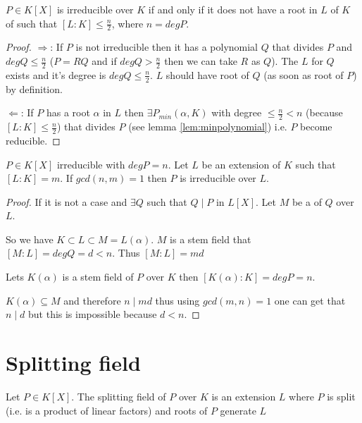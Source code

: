 \begin{corollary}
  $P \in K\left[X\right]$ is irreducible over $K$ if and only if it
  does not have a root in  $L$ of $K$ of such that
  $\left[L:K\right] \le \frac{n}{2}$, where $n = deg P$.
  \label{cor:lec2_1}
  \begin{proof}
    $\Rightarrow$: If $P$ is not irreducible then it has a polynomial $Q$ that
    divides $P$ and $deg Q \le \frac{n}{2}$ ($P = RQ$ and if
    $deg Q > \frac{n}{2}$ then we can take $R$ as $Q$). The
     $L$ for $Q$ exists and it's degree is $deg Q
    \le \frac{n}{2}$. $L$ should have root of $Q$ (as soon as root of
    $P$) by definition.

    $\Leftarrow$: If $P$ has a root $\alpha$ in $L$ then $\exists
    P_{min}\left(\alpha, K\right)$ with degree
    $\le \frac{n}{2} < n$ (because $\left[L:K\right] \le \frac{n}{2}$)
    that divides $P$ (see lemma \ref{lem:minpolynomial}) i.e. $P$
    become reducible. 
  \end{proof}
\end{corollary}

\begin{corollary}
  $P \in K\left[X\right]$ irreducible with $deg P = n$. Let $L$ be an
  extension of $K$ such that $\left[L:K\right] = m$.
  If $gcd\left(n,m\right) = 1$ then $P$ is irreducible over $L$.
  \label{cor:lec2_2}
  \begin{proof}
    If it is not a case and $\exists Q$ such that $Q \mid P$ in
    $L\left[X\right]$. Let $M$ be a  of $Q$
    over $L$.

    So we have $K \subset L \subset M = L\left(\alpha\right)$. $M$ is
    a stem field that $\left[M:L\right] = deg Q = d < n$. Thus
    $\left[M:L\right] = m d$

    Lets $K\left(\alpha\right)$ is a stem field of $P$ over $K$ then
    $\left[K\left(\alpha\right):K\right] = deg P = n$.

    $K\left(\alpha\right) \subseteq M$ and therefore $n \mid md$ thus
    using $gcd(m,n)=1$ one can get that $n \mid d$ but this is
    impossible because $d < n$.
  \end{proof}
\end{corollary}


\section{Splitting field}

\begin{definition}
  Let $P \in K\left[X\right]$.
  The splitting field of $P$ over $K$ is an extension $L$ where $P$ is
  split (i.e. is a product of linear factors) and roots of $P$
  generate $L$
  \label{def:splittingfield}
\end{definition}

